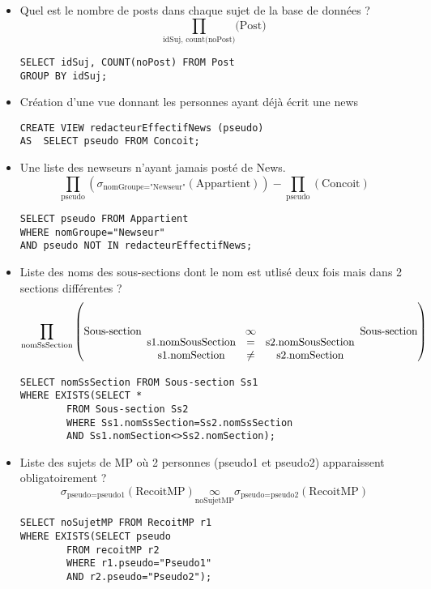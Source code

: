 \bigskip
\begin{itemize} 
	\item Quel est le nombre de posts dans chaque sujet de la base de données ?
		\[\prod_{\text{idSuj, count(noPost)}} \text{(Post)}\]
	\begin{verbatim}
SELECT idSuj, COUNT(noPost) FROM Post
GROUP BY idSuj;
	\end{verbatim}

	\item Création d'une vue donnant les personnes ayant déjà écrit une news
		\begin{verbatim}
CREATE VIEW redacteurEffectifNews (pseudo)
AS	SELECT pseudo FROM Concoit;
		\end{verbatim}

	\item Une liste des newseurs n'ayant jamais posté de News.
	\[\prod_{\text{pseudo}}\left( \sigma_{\text{nomGroupe="Newseur"}}(\text{Appartient})\right)-\prod_{\text{pseudo}}(\text{Concoit})\]
		\begin{verbatim}
SELECT pseudo FROM Appartient
WHERE nomGroupe="Newseur"
AND pseudo NOT IN redacteurEffectifNews;
		\end{verbatim}

	\item Liste des noms des sous-sections dont le nom est utlisé deux fois mais dans 2 sections différentes ?
	\[\prod_{\text{nomSsSection}} \left( \text{Sous-section} \underset{\begin{array}{c c c}\text{s1.nomSousSection}&=&\text{s2.nomSousSection} \\ \text{s1.nomSection}&\neq&\text{s2.nomSection} \end{array}}{\infty} \text{Sous-section}\right)\]
		\begin{verbatim}
SELECT nomSsSection FROM Sous-section Ss1
WHERE EXISTS(SELECT *
		FROM Sous-section Ss2
		WHERE Ss1.nomSsSection=Ss2.nomSsSection
		AND Ss1.nomSection<>Ss2.nomSection);
		\end{verbatim}

	\item Liste des sujets de MP où 2 personnes (pseudo1 et pseudo2) apparaissent obligatoirement ?
	\[\sigma_{\text{pseudo=pseudo1}}(\text{RecoitMP})\underset{\text{noSujetMP}}{\infty} \sigma_{\text{pseudo=pseudo2}}(\text{RecoitMP})\]
		\begin{verbatim}
SELECT noSujetMP FROM RecoitMP r1
WHERE EXISTS(SELECT pseudo 
		FROM recoitMP r2
		WHERE r1.pseudo="Pseudo1"
		AND r2.pseudo="Pseudo2");
		\end{verbatim}


\end{itemize}

